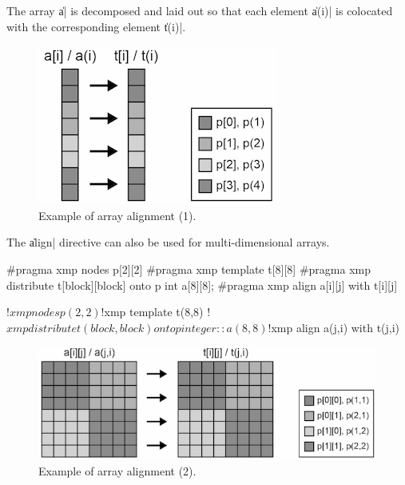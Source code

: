 The array \|a| is decomposed and laid out so that each element
\|a(i)| is colocated with the corresponding {\template} element \|t(i)|.


\begin{figure}
  \centering
  \includegraphics[width=0.7\columnwidth]{figs/1dim.png}
  \caption{Example of array alignment (1).}
\end{figure}

The \|align| directive can also be used for multi-dimensional arrays.

\begin{XCexample}
#pragma xmp nodes p[2][2]
#pragma xmp template t[8][8]
#pragma xmp distribute t[block][block] onto p
int a[8][8];
#pragma xmp align a[i][j] with t[i][j]
\end{XCexample}

\begin{XFexample}
!$xmp nodes p(2,2)
!$xmp template t(8,8)
!$xmp distribute t(block,block) onto p
integer :: a(8,8)
!$xmp align a(j,i) with t(j,i)
\end{XFexample}

\begin{figure}
  \centering
  \includegraphics[width=0.9\columnwidth]{figs/multi-dim.png}
  \caption{Example of array alignment (2).}
\end{figure}


